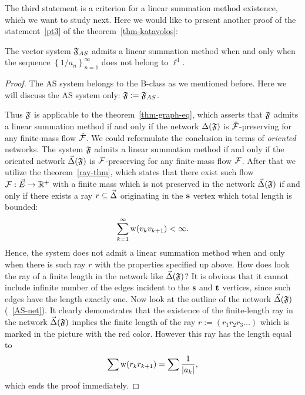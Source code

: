 \documentclass[12pt]{article}
\begin{document}
      The third statement is a criterion for a linear summation method existence, which we want to study next.
      Here we would like to present another proof of the statement~\ref{pt3} of the theorem~\ref{thm-katavolos}:
      \begin{prop}
          The vector system $\mathfrak{F}_{AS}$ admits a linear summation method when and only when
            the sequence $\left\{1/a_n\right\}_{n=1}^\infty$ does not belong to $\ell^1$.
      \end{prop}
      \begin{proof}
        The AS system belongs to the B-class as we mentioned before.
        Here we will discuss the AS system only: $\mathfrak{F} := \mathfrak{F}_{AS}$.

        Thus $\mathfrak{F}$ is applicable to the theorem~\ref{thm-graph-eq}, which asserts
          that $\mathfrak{F}$ admits a linear summation method if and only if
          the network $\Delta(\mathfrak{F})$ is $\mathcal{\hat{F}}$-preserving for any
          finite-mass flow $\mathcal{\hat{F}}$.
        We could reformulate the conclusion in terms of \emph{oriented} networks.
        The system $\mathfrak{F}$ admits a linear summation method if and only if
          the oriented network $\vec{\Delta}(\mathfrak{F})$ is $\mathcal{F}$-preserving for any
          finite-mass flow $\mathcal{F}$.
        After that we utilize the theorem~\ref{ray-thm}, which states that there exist such
          flow $\mathcal{F}: \vec{E} \to \mathbb{R}^{+}$ with a finite mass which is not preserved in
          the network $\vec{\Delta}(\mathfrak{F})$
          if and only if there exists a ray $r \subseteq \vec{\Delta} $ originating in the $\mathbf{s}$ vertex
          which total length is bounded:
          \[
            \sum_{k=1}^\infty \mathrm{w}(v_k v_{k+1}) < \infty.
          \]
          Hence, the system does not admit a linear summation method when and only when there is such ray $r$
            with the properties specified up above.
          How does look the ray of a finite length in the network like $\vec{\Delta}(\mathfrak{F})$?
          It is obvious that it cannot include infinite number of the edges incident to the
            $\mathbf{s}$ and $\mathbf{t}$ vertices, since such edges have the length exactly one.
          Now look at the outline of the network $\vec{\Delta}(\mathfrak{F})$ (~\ref{AS-net}).
          It clearly demonstrates that
            the existence of the finite-length ray in the network $\vec{\Delta}(\mathfrak{F})$ implies
            the finite length of the ray $r:=(r_1 r_2 r_3\dots)$ which is marked in the picture with the red color.
          However this ray has the length equal to
          \[
            \sum \mathrm{w}(r_k r_{k+1}) = \sum \frac{1}{|a_k|},
          \]
          which ends the proof immediately.
      \end{proof}
\end{document}
